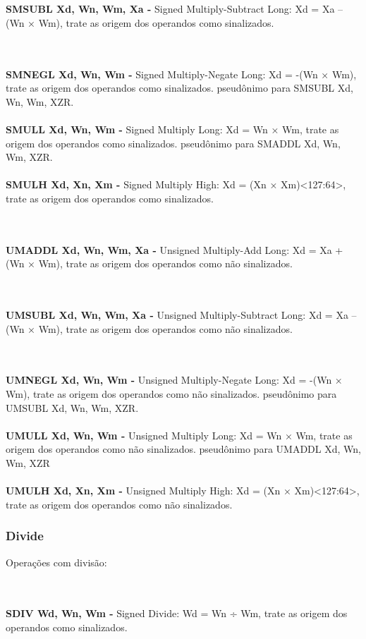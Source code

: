 \documentclass[12pt,a4paper,utf8]{ppgsi}
\begin{document}
\\\\\textbf{SMSUBL Xd, Wn, Wm, Xa -} Signed Multiply-Subtract Long: Xd = Xa – (Wn × Wm), trate as origem dos operandos como sinalizados.

\\\\\textbf{SMNEGL Xd, Wn, Wm -} Signed Multiply-Negate Long: Xd = -(Wn × Wm), trate as origem dos operandos como sinalizados.
pseudônimo para SMSUBL Xd, Wn, Wm, XZR.
\\\\\textbf{SMULL Xd, Wn, Wm -} Signed Multiply Long: Xd = Wn × Wm, trate as origem dos operandos como sinalizados.
pseudônimo para SMADDL Xd, Wn, Wm, XZR.
\\\\\textbf{SMULH Xd, Xn, Xm -} Signed Multiply High: Xd = (Xn × Xm)<127:64>, trate as origem dos operandos como sinalizados.

\\\\\textbf{UMADDL Xd, Wn, Wm, Xa -} Unsigned Multiply-Add Long: Xd = Xa + (Wn × Wm), trate as origem dos operandos como não sinalizados.

\\\\\textbf{UMSUBL Xd, Wn, Wm, Xa -} Unsigned Multiply-Subtract Long: Xd = Xa – (Wn × Wm), trate as origem dos operandos como não sinalizados.

\\\\\textbf{UMNEGL Xd, Wn, Wm -} Unsigned Multiply-Negate Long: Xd = -(Wn × Wm), trate as origem dos operandos como não sinalizados.
pseudônimo para UMSUBL Xd, Wn, Wm, XZR.
\\\\\textbf{UMULL Xd, Wn, Wm -} Unsigned Multiply Long: Xd = Wn × Wm, trate as origem dos operandos como não sinalizados.
pseudônimo para UMADDL Xd, Wn, Wm, XZR
\\\\\textbf{UMULH Xd, Xn, Xm -} Unsigned Multiply High: Xd = (Xn × Xm)<127:64>, trate as origem dos operandos como não sinalizados.


\subsubsection{Divide}
Operações com divisão:

\\\\\textbf{SDIV Wd, Wn, Wm -} Signed Divide: Wd = Wn ÷ Wm, trate as origem dos operandos como sinalizados. 
\end{document}
